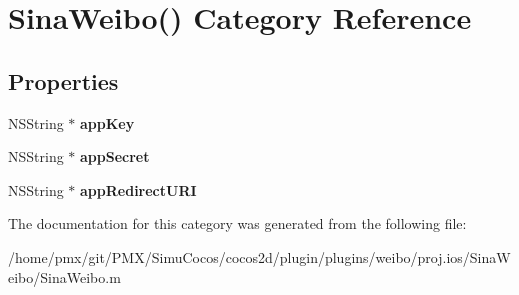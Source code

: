 \hypertarget{categorySinaWeibo_07_08}{}\section{Sina\+Weibo() Category Reference}
\label{categorySinaWeibo_07_08}
\subsection*{Properties}
\begin{DoxyCompactItemize}
\item 
\mbox{\label{categorySinaWeibo_07_08_af517450a0d535f18a24aa138302b6759}} 
N\+S\+String $\ast$ {\bfseries app\+Key}
\item 
\mbox{\label{categorySinaWeibo_07_08_a1668d4be11bdab6dc051e192d6b1c007}} 
N\+S\+String $\ast$ {\bfseries app\+Secret}
\item 
\mbox{\label{categorySinaWeibo_07_08_a4840ad245f2afa6a665236bed5313d08}} 
N\+S\+String $\ast$ {\bfseries app\+Redirect\+U\+RI}
\end{DoxyCompactItemize}


The documentation for this category was generated from the following file\+:\begin{DoxyCompactItemize}
\item 
/home/pmx/git/\+P\+M\+X/\+Simu\+Cocos/cocos2d/plugin/plugins/weibo/proj.\+ios/\+Sina\+Weibo/Sina\+Weibo.\+m\end{DoxyCompactItemize}
